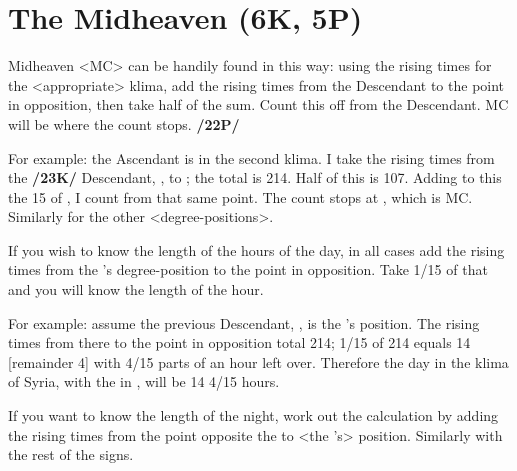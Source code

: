 \section{The Midheaven (6K, 5P)}
Midheaven <MC> can be handily found in this way: using the rising times for the <appropriate> klima, add the rising times from the Descendant to the point in opposition, then take half of the sum.
Count this off from the Descendant. MC will be where the count stops. \textbf{/22P/} 

For example: the Ascendant is \Capricorn\xspace 15\deg\xspace in the second klima. I take the rising times from the \textbf{/23K/} Descendant, \Cancer\xspace 15\deg, to \Capricorn\xspace 15\deg; the total is 214. Half of this is 107. Adding to this the 15\deg\xspace of \Cancer, I count from that same point. The count stops at \Scorpio\xspace 2\deg, which is MC. Similarly for the other <degree-positions>.

If you wish to know the length of the hours of the day, in all cases add the rising times from the \Sun’s degree-position to the point in opposition. Take 1/15 of that and you will know the length of the hour.

For example: assume the previous Descendant, \Cancer\xspace 15\deg, is the \Sun’s position. The rising times from there to the point in opposition total 214; 1/15 of 214 equals 14 [remainder 4] with 4/15 parts of an hour left over. Therefore the day in the klima of Syria, with the \Sun\xspace in \Cancer\xspace 15\deg, will be 14 4/15 hours. 

If you want to know the length of the night, work out the calculation by adding the rising times from the point opposite the \Sun\xspace to <the \Sun’s> position. Similarly with the rest of the signs.

\newpage